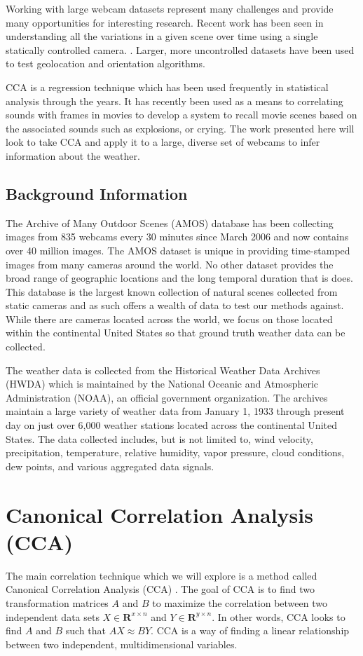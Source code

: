 Working with large webcam datasets represent many challenges and provide many opportunities for interesting research. Recent work has been seen in understanding all the variations in a given scene over time using a single statically controlled camera. \cite{CAVE_0059}. Larger, more uncontrolled datasets have been used to test geolocation \cite{jacobs07geolocate} and orientation \cite{jacobs08geoorient} algorithms.

CCA is a regression technique which has been used frequently in statistical analysis through the years. It has recently been used as a means to correlating sounds with frames in movies to develop a system to recall movie scenes based on the associated sounds \cite{957143} such as explosions, or crying. The work presented here will look to take CCA and apply it to a large, diverse set of webcams to infer information about the weather.

\section{Background Information}
The Archive of Many Outdoor Scenes (AMOS) database \cite{jacobs07amos} has been collecting images from 835 webcams every 30 minutes since March 2006 and now contains over 40 million images. The AMOS dataset is unique in providing time-stamped images from many cameras around the world. No other dataset provides the broad range of geographic locations and the long temporal duration that is does. This database is the largest known collection of natural scenes collected from static cameras and as such offers a wealth of data to test our methods against. While there are cameras located across the world, we focus on those located within the continental United States so that ground truth weather data can be collected.

The weather data is collected from the Historical Weather Data Archives (HWDA) \cite{noaa} which is maintained by the National Oceanic and Atmospheric Administration (NOAA), an official government organization. The archives maintain a large variety of weather data from January 1, 1933 through present day on just over 6,000 weather stations located across the continental United States. The data collected includes, but is not limited to, wind velocity, precipitation, temperature, relative humidity, vapor pressure, cloud conditions, dew points, and various aggregated data signals.

\chapter{Canonical Correlation Analysis (CCA)}
\label{cpt:cca}
The main correlation technique which we will explore is a method called Canonical Correlation Analysis (CCA) \cite{hotelling}. The goal of CCA is to find two transformation matrices $A$ and $B$ to maximize the correlation between two independent data sets $X \in \mathbf{R}^{x\times n}$ and $Y \in \mathbf{R}^{y\times n}$. In other words, CCA looks to find $A$ and $B$ such that $AX\approx BY$. CCA is a way of finding a linear relationship between two independent, multidimensional variables.


